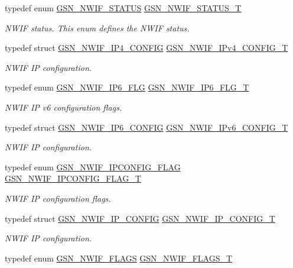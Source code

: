 \begin{DoxyCompactItemize}
typedef enum \hyperlink{a00670_ga6831d8e94870e58c8ba6de3fd14e829d}{GSN\_\-NWIF\_\-STATUS} \hyperlink{a00670_ga31b009654c9ee4d7037151b19f1f213a}{GSN\_\-NWIF\_\-STATUS\_\-T}
\begin{DoxyCompactList}\small\item\em NWIF status. This enum defines the NWIF status. \end{DoxyCompactList}\item 
typedef struct \hyperlink{a00170}{GSN\_\-NWIF\_\-IP4\_\-CONFIG} \hyperlink{a00670_ga30485b44668b2a98ecdc5571f9a6fed5}{GSN\_\-NWIF\_\-IPv4\_\-CONFIG\_\-T}
\begin{DoxyCompactList}\small\item\em NWIF IP configuration. \end{DoxyCompactList}\item 
typedef enum \hyperlink{a00670_ga283a80240d803667a00eb79d19d53fd6}{GSN\_\-NWIF\_\-IP6\_\-FLG} \hyperlink{a00670_gaeae6a78e867541f488c5b1db9f7508f7}{GSN\_\-NWIF\_\-IP6\_\-FLG\_\-T}
\begin{DoxyCompactList}\small\item\em NWIF IP v6 configuration flags. \end{DoxyCompactList}\item 
typedef struct \hyperlink{a00171}{GSN\_\-NWIF\_\-IP6\_\-CONFIG} \hyperlink{a00670_gab09a924a18be9757c337786abe5903f0}{GSN\_\-NWIF\_\-IPv6\_\-CONFIG\_\-T}
\begin{DoxyCompactList}\small\item\em NWIF IP configuration. \end{DoxyCompactList}\item 
typedef enum \hyperlink{a00670_gaa290d30cd14afde370ebe3cc0bc80713}{GSN\_\-NWIF\_\-IPCONFIG\_\-FLAG} \hyperlink{a00670_ga952c642f49bc1ff0ab65d34c4843b5e9}{GSN\_\-NWIF\_\-IPCONFIG\_\-FLAG\_\-T}
\begin{DoxyCompactList}\small\item\em NWIF IP configuration flags. \end{DoxyCompactList}\item 
typedef struct \hyperlink{a00172}{GSN\_\-NWIF\_\-IP\_\-CONFIG} \hyperlink{a00670_ga72947a68a092d535f5989c7c5e2fe71b}{GSN\_\-NWIF\_\-IP\_\-CONFIG\_\-T}
\begin{DoxyCompactList}\small\item\em NWIF IP configuration. \end{DoxyCompactList}\item 
typedef enum \hyperlink{a00670_gaa0ec94e77c73c9648888a870bd0f041a}{GSN\_\-NWIF\_\-FLAGS} \hyperlink{a00670_ga2c209f2b9b6b2b6b0b2e1132acd45891}{GSN\_\-NWIF\_\-FLAGS\_\-T}

\end{DoxyCompactItemize}

